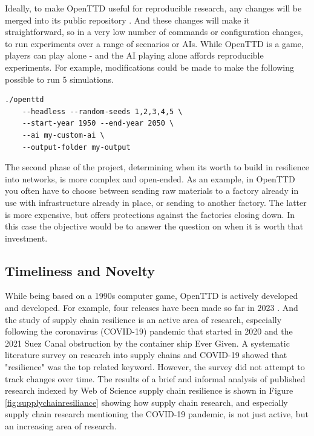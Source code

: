 \documentclass[a4paper,11pt]{article}
\begin{document}
Ideally, to make OpenTTD useful for reproducible research, any changes will be merged into its public repository \cite{openttdRepo}. And these changes will make it straightforward, so in a very low number of commands or configuration changes, to run experiments over a range of scenarios or AIs. While OpenTTD is a game, players can play alone - and the AI playing alone affords reproducible experiments. For example, modifications could be made to make the following possible to run 5 simulations.

\begin{verbatim}
./openttd
    --headless --random-seeds 1,2,3,4,5 \
    --start-year 1950 --end-year 2050 \
    --ai my-custom-ai \
    --output-folder my-output
\end{verbatim}

The second phase of the project, determining when its worth to build in resilience into networks, is more complex and open-ended. As an example, in OpenTTD you often have to choose between sending raw materials to a factory already in use with infrastructure already in place, or sending to another factory. The latter is more expensive, but offers protections against the factories closing down. In this case the objective would be to answer the question on when it is worth that investment.

\subsection{Timeliness and Novelty}

While being based on a 1990s computer game, OpenTTD is actively developed and developed. For example, four releases have been made so far in 2023 \cite{openttdReleases}. And the study of supply chain resilience is an active area of research, especially following the coronavirus (COVID-19) pandemic that started in 2020 and the 2021 Suez Canal obstruction by the container ship Ever Given. A systematic literature survey on research into supply chains and COVID-19 \cite{moosavi_supply_2022} showed that "resilience" was the top related keyword. However, the survey did not attempt to track changes over time. The results of a brief and informal analysis of published research indexed by Web of Science supply chain resilience is shown in Figure \ref{fig:supplychainresiliance} showing how supply chain research, and especially supply chain research mentioning the COVID-19 pandemic, is not just active, but an increasing area of research.
\end{document}
